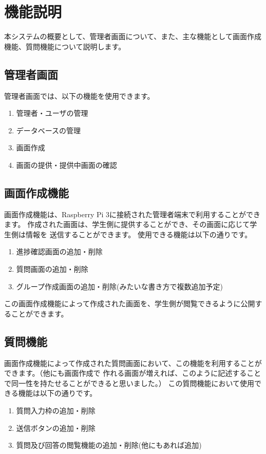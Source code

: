 \section{機能説明}
本システムの概要として、管理者画面について、また、主な機能として画面作成機能、質問機能について説明します。
\subsection{管理者画面}
管理者画面では、以下の機能を使用できます。
\begin{enumerate}
  \item 管理者・ユーザの管理
  \item データベースの管理%
  \item 画面作成
  \item 画面の提供・提供中画面の確認
\end{enumerate}

\subsection{画面作成機能}
画面作成機能は、Raspberry Pi 3に接続された管理者端末で利用することができます。
作成された画面は、学生側に提供することができ、その画面に応じて学生側は情報を
送信することができます。
使用できる機能は以下の通りです。
\begin{enumerate}
  \item 進捗確認画面の追加・削除
  \item 質問画面の追加・削除
  \item グループ作成画面の追加・削除(みたいな書き方で複数追加予定)
\end{enumerate}

この画面作成機能によって作成された画面を、学生側が閲覧できるように公開することができます。

\subsection{質問機能}
画面作成機能によって作成された質問画面において、この機能を利用することができます。（他にも画面作成で
作れる画面が増えれば、このように記述することで同一性を持たせることができると思いました。）
この質問機能において使用できる機能は以下の通りです。
\begin{enumerate}
  \item 質問入力枠の追加・削除
  \item 送信ボタンの追加・削除
  \item 質問及び回答の閲覧機能の追加・削除(他にもあれば追加)
\end{enumerate}
